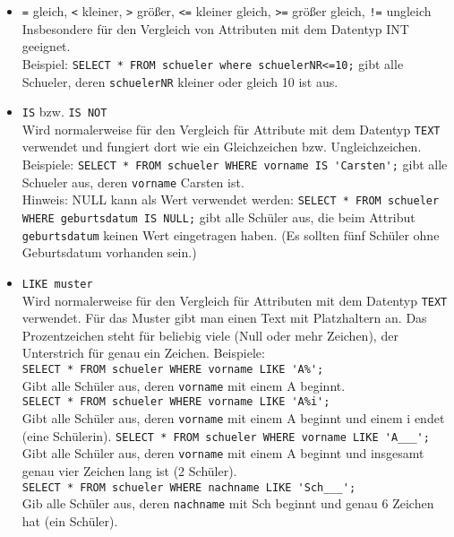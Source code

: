 \begin{itemize}
	\item \lstinline!=! gleich, \lstinline!<! kleiner, \lstinline!>! größer, \lstinline!<=! kleiner gleich, \lstinline!>=! größer gleich, \lstinline&!=& ungleich\\
	Insbesondere für den Vergleich von Attributen mit dem Datentyp INT geeignet.\\
	Beispiel: \lstinline!SELECT * FROM schueler where schuelerNR<=10;! gibt alle Schueler, deren \lstinline!schuelerNR! kleiner oder gleich 10 ist aus.
	\item \lstinline!IS! bzw. \lstinline!IS NOT!\\
	Wird normalerweise für den Vergleich für Attribute mit dem Datentyp \lstinline!TEXT! verwendet und fungiert dort wie ein Gleichzeichen bzw. Ungleichzeichen.\\
	Beispiele: 	\lstinline!SELECT * FROM schueler WHERE vorname IS 'Carsten';! gibt alle Schueler aus, deren \lstinline!vorname! Carsten ist.\\
	Hinweis: NULL kann als Wert verwendet werden: \lstinline!SELECT * FROM schueler WHERE geburtsdatum IS NULL;! gibt alle Schüler aus, die beim Attribut \lstinline!geburtsdatum! keinen Wert eingetragen haben. (Es sollten fünf Schüler ohne Geburtsdatum vorhanden sein.)
	\item \lstinline!LIKE muster!\\
	Wird normalerweise für den Vergleich für Attributen mit dem Datentyp \lstinline!TEXT! verwendet. Für das Muster gibt man einen Text mit Platzhaltern an. Das Prozentzeichen steht für beliebig viele (Null oder mehr Zeichen), der Unterstrich für genau ein Zeichen. Beispiele:\\
	\lstinline!SELECT * FROM schueler WHERE vorname LIKE 'A%';!\\
	Gibt alle Schüler aus, deren \lstinline!vorname! mit einem A beginnt.\\
	\lstinline!SELECT * FROM schueler WHERE vorname LIKE 'A%i';!\\
	Gibt alle Schüler aus, deren \lstinline!vorname! mit einem A beginnt und einem i endet (eine Schülerin).
	\lstinline!SELECT * FROM schueler WHERE vorname LIKE 'A___';!\\
	Gibt alle Schüler aus, deren \lstinline!vorname! mit einem A beginnt und insgesamt genau vier Zeichen lang ist (2 Schüler).\\
	\lstinline!SELECT * FROM schueler WHERE nachname LIKE 'Sch___';!\\
	Gib alle Schüler aus, deren \lstinline!nachname! mit Sch beginnt und genau 6 Zeichen hat (ein Schüler).

\end{itemize}
